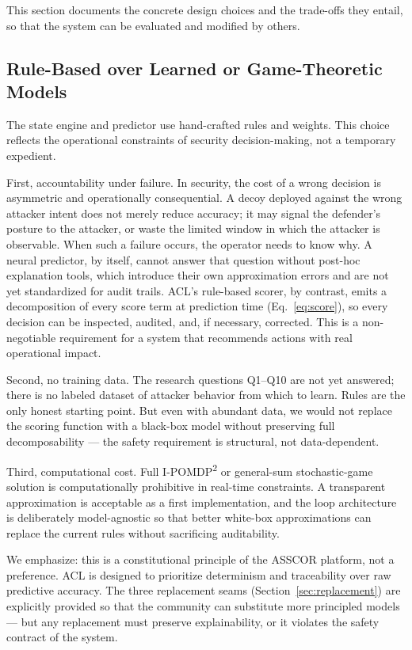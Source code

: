 \documentclass[preprints,article,accept,oneauthor]{Definitions/mdpi}
\begin{document}
This section documents the concrete design choices and the trade-offs they
entail, so that the system can be evaluated and modified by others.

\subsection{Rule-Based over Learned or Game-Theoretic Models}
The state engine and predictor use hand-crafted rules and weights. This choice reflects the operational constraints of security decision-making, not a temporary expedient.

First, accountability under failure. In security, the cost of a wrong decision is asymmetric and operationally consequential. A decoy deployed against the wrong attacker intent does not merely reduce accuracy; it may signal the defender's posture to the attacker, or waste the limited window in which the attacker is observable. When such a failure occurs, the operator needs to know why. A neural predictor, by itself, cannot answer that question without post-hoc explanation tools, which introduce their own approximation errors and are not yet standardized for audit trails. ACL's rule-based scorer, by contrast, emits a decomposition of every score term at prediction time (Eq.~\ref{eq:score}), so every decision can be inspected, audited, and, if necessary, corrected. This is a non-negotiable requirement for a system that recommends actions with real operational impact.

Second, no training data. The research questions Q1--Q10 are not yet answered; there is no labeled dataset of attacker behavior from which to learn. Rules are the only honest starting point. But even with abundant data, we would not replace the scoring function with a black-box model without preserving full decomposability --- the safety requirement is structural, not data-dependent.

Third, computational cost. Full I-POMDP\textsuperscript{2} or general-sum stochastic-game solution is computationally prohibitive in real-time constraints. A transparent approximation is acceptable as a first implementation, and the loop architecture is deliberately model-agnostic so that better white-box approximations can replace the current rules without sacrificing auditability.

We emphasize: this is a constitutional principle of the ASSCOR platform, not a preference. ACL is designed to prioritize determinism and traceability over raw predictive accuracy. The three replacement seams (Section~\ref{sec:replacement}) are explicitly provided so that the community can substitute more principled models --- but any replacement must preserve explainability, or it violates the safety contract of the system.
\end{document}
